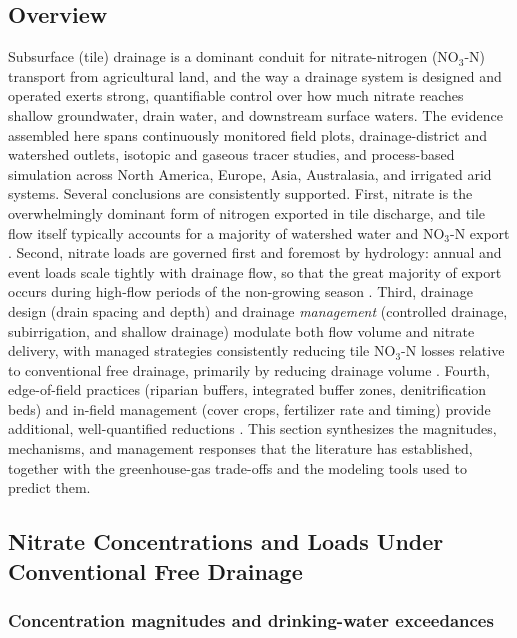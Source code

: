 \subsection{Overview}

Subsurface (tile) drainage is a dominant conduit for nitrate-nitrogen (NO$_3$-N) transport from agricultural land, and the way a drainage system is designed and operated exerts strong, quantifiable control over how much nitrate reaches shallow groundwater, drain water, and downstream surface waters. The evidence assembled here spans continuously monitored field plots, drainage-district and watershed outlets, isotopic and gaseous tracer studies, and process-based simulation across North America, Europe, Asia, Australasia, and irrigated arid systems. Several conclusions are consistently supported. First, nitrate is the overwhelmingly dominant form of nitrogen exported in tile discharge, and tile flow itself typically accounts for a majority of watershed water and NO$_3$-N export \parencite{Williams2015,Grose2022,Hayashi1999}. Second, nitrate loads are governed first and foremost by hydrology: annual and event loads scale tightly with drainage flow, so that the great majority of export occurs during high-flow periods of the non-growing season \parencite{Kladivko2021,ROSSI1991,Bauwe2020,Ikenberry2014,Speir2021}. Third, drainage design (drain spacing and depth) and drainage \emph{management} (controlled drainage, subirrigation, and shallow drainage) modulate both flow volume and nitrate delivery, with managed strategies consistently reducing tile NO$_3$-N losses relative to conventional free drainage, primarily by reducing drainage volume \parencite{Cooke2012,Nash2015d,Elmi2004,Smith2019,Ross2016}. Fourth, edge-of-field practices (riparian buffers, integrated buffer zones, denitrification beds) and in-field management (cover crops, fertilizer rate and timing) provide additional, well-quantified reductions \parencite{Jaynes2014,Carstensen2021,Kaspar2007,Chaplot2004}. This section synthesizes the magnitudes, mechanisms, and management responses that the literature has established, together with the greenhouse-gas trade-offs and the modeling tools used to predict them.

\subsection{Nitrate Concentrations and Loads Under Conventional Free Drainage}

\subsubsection{Concentration magnitudes and drinking-water exceedances}

